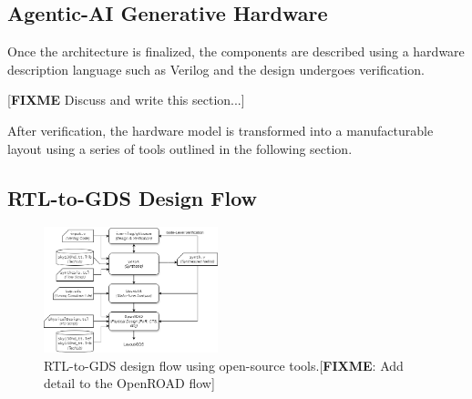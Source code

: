 \subsection{Agentic-AI Generative Hardware}

Once the architecture is finalized, the components are described using a hardware description language such as Verilog and the design undergoes verification. 

[\textbf{FIXME} Discuss and write this section...]

After verification, the hardware model is transformed into a manufacturable layout using a series of tools outlined in the following section.

\subsection{RTL-to-GDS Design Flow}

\begin{figure}[htbp]
	\includegraphics[width=0.45\textwidth]{figs/rtl2gds-toolchain.png}
	\caption{RTL-to-GDS design flow using open-source tools.[\textbf{FIXME}: Add detail to the OpenROAD flow]}
	\label{fig:RTL-to-GDS}
\end{figure}

